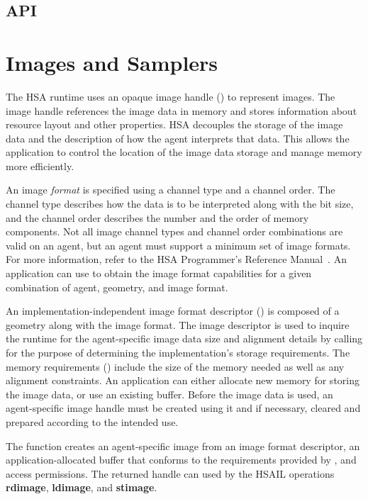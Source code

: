 \documentclass[oneside]{book}
\newcommand{\reffun}[1]{\textbf{#1}}
\newcommand{\refhsl}[1]{\reffun{#1}}
\begin{document}
\newpage
\subsection{API}


\newpage

\section{Images and Samplers}\label{sec:images}

The HSA runtime uses an opaque image handle () to
represent images. The image handle references the image data in memory and
stores information about resource layout and other properties. HSA decouples
the storage of the image data and the description of how the agent
interprets that data. This allows the application to control the location of the
image data storage and manage memory more efficiently.

An image \textit{format} is specified using a channel type and a channel
order. The channel type describes how the data is to be interpreted along with
the bit size, and the channel order describes the number and the order of memory
components. Not all image channel types and channel order combinations are valid
on an agent, but an agent must support a minimum set of image
formats. For more information, refer to the HSA Programmer's Reference
Manual~\cite{prm}. An application can use 
to obtain the image format capabilities for a given combination of agent,
geometry, and image format.

An implementation-independent image format descriptor
() is composed of a geometry along with the
image format. The image descriptor is used to inquire the runtime for the
agent-specific image data size and alignment details by calling
 for the purpose of determining the
implementation's storage requirements. The memory requirements
() include the size of the memory needed as
well as any alignment constraints. An application can either allocate new memory
for storing the image data, or use an existing buffer. Before the image data is
used, an agent-specific image handle must be created using it and if necessary,
cleared and prepared according to the intended use.

The function  creates an agent-specific image
from an image format descriptor, an application-allocated buffer that conforms
to the requirements provided by , and access
permissions. The returned handle can used by the HSAIL operations
\refhsl{rdimage}, \refhsl{ldimage}, and \refhsl{stimage}.
\end{document}
